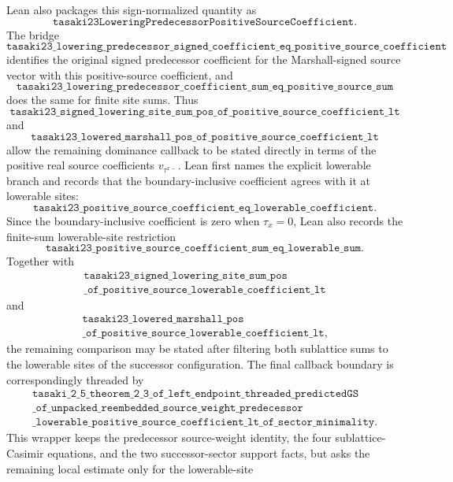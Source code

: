 \documentclass[a4paper,11pt]{article}
\begin{document}
Lean also packages this sign-normalized quantity as
\[
\texttt{tasaki23LoweringPredecessorPositiveSourceCoefficient}.
\]
The bridge
\[
\texttt{tasaki23\_lowering\_predecessor\_signed\_coefficient\_eq\_positive\_source\_coefficient}
\]
identifies the original signed predecessor coefficient for the
Marshall-signed source vector with this positive-source coefficient, and
\[
\texttt{tasaki23\_lowering\_predecessor\_coefficient\_sum\_eq\_positive\_source\_sum}
\]
does the same for finite site sums.  Thus
\[
\texttt{tasaki23\_signed\_lowering\_site\_sum\_pos\_of\_positive\_source\_coefficient\_lt}
\]
and
\[
\texttt{tasaki23\_lowered\_marshall\_pos\_of\_positive\_source\_coefficient\_lt}
\]
allow the remaining dominance callback to be stated directly in terms of
the positive real source coefficients \(v_{\tau^{x-}}\).
Lean first names the explicit lowerable branch and records that the
boundary-inclusive coefficient agrees with it at lowerable sites:
\[
\texttt{tasaki23\_positive\_source\_coefficient\_eq\_lowerable\_coefficient}.
\]
Since the boundary-inclusive coefficient is zero when \(\tau_x=0\), Lean
also records the finite-sum lowerable-site restriction
\[
\texttt{tasaki23\_positive\_source\_coefficient\_sum\_eq\_lowerable\_sum}.
\]
Together with
\[
\begin{gathered}
\texttt{tasaki23\_signed\_lowering\_site\_sum\_pos}\\
\texttt{\_of\_positive\_source\_lowerable\_coefficient\_lt}
\end{gathered}
\]
and
\[
\begin{gathered}
\texttt{tasaki23\_lowered\_marshall\_pos}\\
\texttt{\_of\_positive\_source\_lowerable\_coefficient\_lt},
\end{gathered}
\]
the remaining comparison may be stated after filtering both sublattice
sums to the lowerable sites of the successor configuration.
The final callback boundary is correspondingly threaded by
\[
\begin{gathered}
\texttt{tasaki\_2\_5\_theorem\_2\_3\_of\_left\_endpoint\_threaded\_predictedGS}\\
\texttt{\_of\_unpacked\_reembedded\_source\_weight\_predecessor}\\
\texttt{\_lowerable\_positive\_source\_coefficient\_lt\_of\_sector\_minimality}.
\end{gathered}
\]
This wrapper keeps the predecessor source-weight identity, the four
sublattice-Casimir equations, and the two successor-sector support facts,
but asks the remaining local estimate only for the lowerable-site
\end{document}
